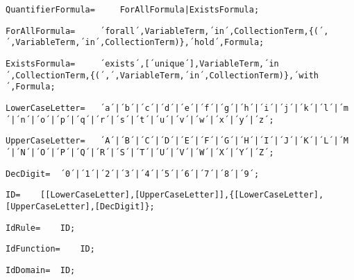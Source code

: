 \documentclass{article}
\begin{document}
    \begin{lstlisting}[mathescape=true]
     QuantifierFormula= 	ForAllFormula|ExistsFormula;
    \end{lstlisting}
    
    \begin{lstlisting}[mathescape=true]
     ForAllFormula= 	´forall´,VariableTerm,´in´,CollectionTerm,{(´,´,VariableTerm,´in´,CollectionTerm)},´hold´,Formula;
    \end{lstlisting}
    
    \begin{lstlisting}[mathescape=true]
     ExistsFormula= 	´exists´,[´unique´],VariableTerm,´in´,CollectionTerm,{(´,´,VariableTerm,´in´,CollectionTerm)},´with´,Formula;
    \end{lstlisting}
    
    \begin{lstlisting}[mathescape=true]
     LowerCaseLetter= 	´a´|´b´|´c´|´d´|´e´|´f´|´g´|´h´|´i´|´j´|´k´|´l´|´m´|´n´|´o´|´p´|´q´|´r´|´s´|´t´|´u´|´v´|´w´|´x´|´y´|´z´;
    \end{lstlisting}
    
    \begin{lstlisting}[mathescape=true]
     UpperCaseLetter= 	´A´|´B´|´C´|´D´|´E´|´F´|´G´|´H´|´I´|´J´|´K´|´L´|´M´|´N´|´O´|´P´|´Q´|´R´|´S´|´T´|´U´|´V´|´W´|´X´|´Y´|´Z´;
    \end{lstlisting}
    
    \begin{lstlisting}[mathescape=true]
     DecDigit= 	´0´|´1´|´2´|´3´|´4´|´5´|´6´|´7´|´8´|´9´;
    \end{lstlisting}
    
    \begin{lstlisting}[mathescape=true]
     ID= 	[[LowerCaseLetter],[UpperCaseLetter]],{[LowerCaseLetter],[UpperCaseLetter],[DecDigit]};
    \end{lstlisting}
    
    \begin{lstlisting}[mathescape=true]
     IdRule= 	ID;
    \end{lstlisting}
    
    \begin{lstlisting}[mathescape=true]
     IdFunction= 	ID;
    \end{lstlisting}
    
    \begin{lstlisting}[mathescape=true]
     IdDomain= 	ID;
    \end{lstlisting}
    
\end{document}
